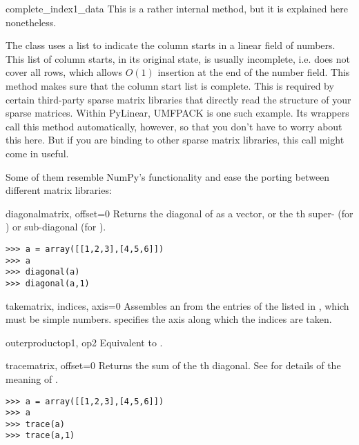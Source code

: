 \begin{methoddesc}[SparseExecuteMatrix]{complete_index1_data}{}
  This is a rather internal method, but it is explained here
  nonetheless.

  The  class uses a list to indicate the
  column starts in a linear field of numbers. This list of column
  starts, in its original state, is usually incomplete, i.e. does not
  cover all rows, which allows $O(1)$ insertion at the end of the
  number field. This method makes sure that the column start list is
  complete. This is required by certain third-party sparse matrix
  libraries that directly read the structure of your sparse
  matrices. Within PyLinear, UMFPACK is one such example. Its wrappers
  call this method automatically, however, so that you don't have to
  worry about this here. But if you are binding to other sparse matrix
  libraries, this call might come in useful.
\end{methoddesc}

Some of them resemble NumPy's functionality and ease the porting between
different matrix libraries:

\begin{funcdesc}{diagonal}{matrix, offset=0}
  Returns the diagonal of  as a vector, or the th
  super- (for ) or sub-diagonal (for ).
\begin{verbatim}
>>> a = array([[1,2,3],[4,5,6]])
>>> a
>>> diagonal(a)
>>> diagonal(a,1)
\end{verbatim}
\end{funcdesc}
\begin{funcdesc}{take}{matrix, indices, axis=0}
  Assembles an  from the entries of the 
  listed in , which must be simple numbers. 
  specifies the axis along which the indices are taken.
\end{funcdesc}
\begin{funcdesc}{outerproduct}{op1, op2}
  Equivalent to .
\end{funcdesc}
\begin{funcdesc}{trace}{matrix, offset=0}
  Returns the sum of the th diagonal. See 
  for details of the meaning of .
\begin{verbatim}
>>> a = array([[1,2,3],[4,5,6]])
>>> a
>>> trace(a)
>>> trace(a,1)
\end{verbatim}
\end{funcdesc}
